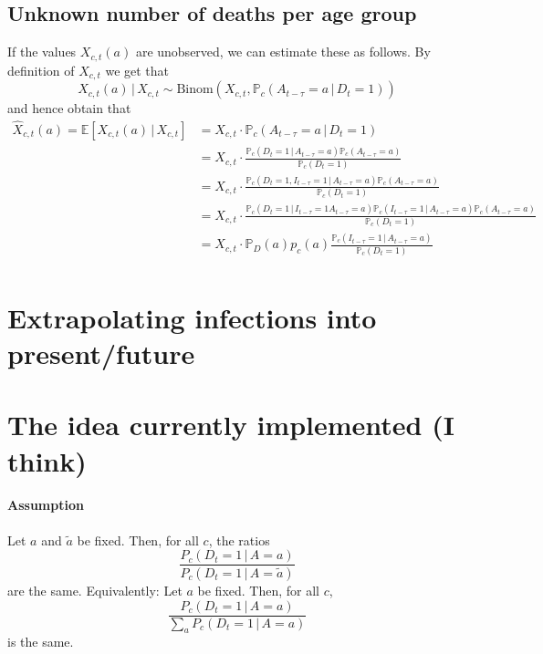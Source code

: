 \documentclass[a4paper]{article}
\renewcommand\P{\mathbb{P}}
\newcommand\E{\mathbb{E}}
\newcommand{\given}{\, \vert \,}
\begin{document}
\subsection{Unknown number of deaths per age group}
%
If the values $X_{c,t}(a)$ are unobserved, we can estimate these as follows. By definition of $X_{c,t}$ we get that
$$X_{c,t}(a) \given X_{c,t} \sim \text{Binom}(X_{c,t}, \P_c(A_{t-\tau} = a \given D_{t} = 1))$$
and hence obtain that
\begin{align*}
\hat{X}_{c,t}(a) = \E[X_{c,t}(a) \given X_{c,t}] 	&= X_{c,t} \cdot \P_c(A_{t-\tau} = a \given D_{t} = 1) \\
																		&= X_{c,t} \cdot \frac{\P_c(D_t = 1 \given A_{t-\tau} = a) \P_c(A_{t-\tau} = a)}{\P_c(D_t = 1)} \\
																		&= X_{c,t} \cdot \frac{\P_c(D_t = 1, I_{t-\tau} = 1 \given A_{t-\tau} = a) \P_c(A_{t-\tau} = a)}{\P_c(D_t = 1)} \\
																		&= X_{c,t} \cdot \frac{\P_c(D_t = 1\given I_{t-\tau} = 1 A_{t-\tau} = a) \P_c(I_{t-\tau} = 1 \given A_{t-\tau} = a) \P_c(A_{t-\tau} = a)}{\P_c(D_t = 1)} \\
																		&= X_{c,t} \cdot \P_D(a) p_c(a) \frac{\P_c(I_{t-\tau} = 1 \given A_{t-\tau} = a) }{\P_c(D_t = 1)} \\
\end{align*}

\section{Extrapolating infections into present/future}


\section{The idea currently implemented (I think)}

\paragraph{Assumption} Let $a$ and $\tilde{a}$ be fixed. Then, for all $c$, the ratios 
$$
\frac{P_c(D_t = 1\,|\,A = a)}{P_c(D_t = 1\,|\,A = \tilde{a})}
$$
are the same. Equivalently: Let $a$ be fixed. Then, for all $c$,
$$
\frac{P_c(D_t = 1\,|\,A = a)}
{\sum_a P_c(D_t = 1\,|\,A = a)}
$$
is the same.
\end{document}
